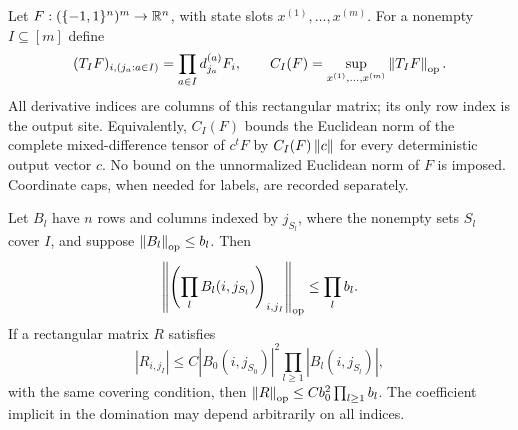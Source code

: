 Let $F:(\{-1,1\}^n)^m\to\mathbb R^n$, with state slots
$x^{(1)},\ldots,x^{(m)}$.  For a nonempty $I\subseteq[m]$ define
\begin{equation}
 (T_IF)_{i,(j_a:a\in I)}
   =\prod_{a\in I}d_{j_a}^{(a)}F_i,
 \qquad C_I(F)=\sup_{x^{(1)},\ldots,x^{(m)}}
                         \left\lVert T_IF\right\rVert_{\mathrm{op}}.
 \label{eq:path-mixed-norm}
\end{equation}
All derivative indices are columns of this rectangular matrix; its
only row index is the output site.  Equivalently, $C_I(F)$ bounds the
Euclidean norm of the complete mixed-difference tensor of $c^tF$ by
$C_I(F)\left\lVert c\right\rVert$ for every deterministic output vector $c$.
No bound on the unnormalized Euclidean norm of $F$ is imposed.
Coordinate caps, when needed for labels, are recorded separately.

\begin{lemma}
Let $B_l$ have $n$ rows and columns indexed by $j_{S_l}$, where the
nonempty sets $S_l$ cover $I$, and suppose $\left\lVert B_l\right\rVert_{\mathrm{op}}\le b_l$.\label{lem:path-tensor-product}
Then
\begin{equation}
 \left\lVert \left(\prod_l B_l(i,j_{S_l})\right)_{i,j_I}\right\rVert_{\mathrm{op}}
 \le\prod_l b_l.
 \label{eq:path-tensor-product}
\end{equation}
If a rectangular matrix $R$ satisfies
\begin{equation}
 |R_{i,j_I}|
 \le C|B_0(i,j_{S_0})|^2
                     \prod_{l\ge1}|B_l(i,j_{S_l})|,
 \label{eq:path-square-domination}
\end{equation}
with the same covering condition, then
$\left\lVert R\right\rVert_{\mathrm{op}}\le Cb_0^2\prod_{l\ge1}b_l$.
The coefficient implicit in the domination may depend arbitrarily on
all indices.
\end{lemma}

